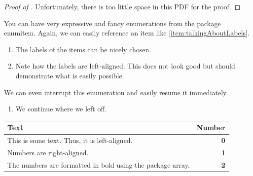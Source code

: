 \begin{proof}[Proof of ]
    Unfortunately, there is too little space in this PDF for the proof.
\end{proof}

You can have very expressive and fancy enumerations from the package \textsf{enumitem}. Again, we can easily reference an item like \cref{item:talkingAboutLabels}.
\begin{enumerate}[label = (\roman*), align = left, labelwidth = 2 em, labelsep = 0 em]
    \item The labels of the items can be nicely chosen.\label{item:talkingAboutLabels}
    
    \item Note how the labels are left-aligned. This does not look good but should demonstrate what is easily possible.
\end{enumerate}
We can even interrupt this enumeration and easily resume it immediately.
\begin{enumerate}[resume*]
    \item We continue where we left off.
\end{enumerate}

\begin{table}[t]
    \centering
    \label{tab:textAndNumbers}
    \begin{tabular}{p{}>{\bfseries}r}
        \toprule
        Text                                                                & Number\\\midrule
        This is some text. Thus, it is left-aligned.                        & 0\\
        Numbers are right-aligned.                                          & 1\\
        The numbers are formatted in bold using the package \textsf{array}. & 2\\\bottomrule
    \end{tabular}
\end{table}

